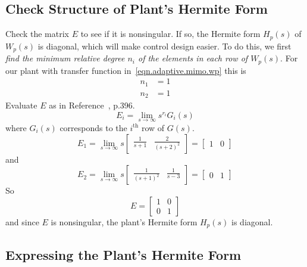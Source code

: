 \subsection{Check Structure of Plant's Hermite Form}

Check the matrix $E$ to see if it is nonsingular.
If so, the Hermite form $H_{p}(s)$ of $W_{p}(s)$ is diagonal, which will make control design easier.
To do this, we first \textit{find the minimum relative degree $n_{i}$ of the elements in each row of $W_{p}(s)$}.
For our plant with transfer function in~\eqref{eqn.adaptive.mimo.wp} this is
\begin{equation}\label{eqn.adaptive.mimo.minnstarrows}
  \begin{split}
    n_{1}&=1 \\
    n_{2}&=1
  \end{split}
\end{equation}
Evaluate $E$ as in Reference~\cite{narendra.stable.2005}, p.396.
\begin{equation*}
  E_{i}=\lim_{s\rightarrow\infty}s^{r_{i}}G_{i}(s)
\end{equation*}
where $G_{i}(s)$ corresponds to the $i^{\text{th}}$ row of $G(s)$.
\begin{equation*}
  E_{1}=\lim_{s\rightarrow\infty}s
  \begin{bmatrix}
    \frac{1}{s+1} & \frac{2}{(s+2)^{2}}
  \end{bmatrix}=
  \begin{bmatrix}
    1 & 0
  \end{bmatrix}
\end{equation*}
and
\begin{equation*}
  E_{2}=\lim_{s\rightarrow\infty}s
  \begin{bmatrix}
    \frac{1}{(s+1)^{2}} & \frac{1}{s-3}
  \end{bmatrix}=
  \begin{bmatrix}
    0 & 1
  \end{bmatrix}
\end{equation*}
So
\begin{equation*}
  E=
  \begin{bmatrix}
    1 & 0 \\
    0 & 1
  \end{bmatrix}
\end{equation*}
and since $E$ is nonsingular, the plant's Hermite form $H_{p}(s)$ is diagonal.

\subsection{Expressing the Plant's Hermite Form}

